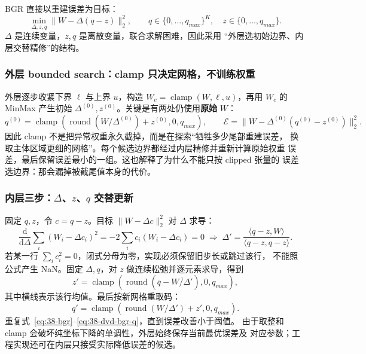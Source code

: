 BGR 直接以重建误差为目标：
\begin{equation}
  \min_{\Delta,z,q}\|W-\Delta(q-z)\|_2^2,
  \qquad q\in\{0,\ldots,q_{max}\}^K,\quad z\in\{0,\ldots,q_{max}\}.
  \label{eq:38-dvd-bgr-objective}
\end{equation}
$\Delta$ 是连续变量，$z,q$ 是离散变量，联合求解困难，因此采用
“外层选初始边界、内层交替精修”的结构。

\subsubsection{外层 bounded search：clamp 只决定网格，不训练权重}

外层逐步收紧下界 $\ell$ 与上界 $u$，构造
$W_c=\operatorname{clamp}(W,\ell,u)$，再用 $W_c$ 的 MinMax 产生初始
$\Delta^{(0)},z^{(0)}$。关键是有两处仍使用\textbf{原始} $W$：
\begin{equation}
  q^{(0)}=\operatorname{clamp}\!\left(
  \operatorname{round}(W/\Delta^{(0)})+z^{(0)},0,q_{max}\right),
  \qquad
  \mathcal E=\|W-\Delta^{(0)}(q^{(0)}-z^{(0)})\|_2^2.
  \label{eq:38-dvd-bgr-outer}
\end{equation}
因此 clamp 不是把异常权重永久截掉，而是在探索“牺牲多少尾部重建误差，
换取主体区域更细的网格”。每个候选边界都经过内层精修并重新计算原始权重
误差，最后保留误差最小的一组。这也解释了为什么不能只按 clipped 张量的
误差选边界：那会漏掉被截尾值本身的代价。

\subsubsection{内层三步：$\Delta$、$z$、$q$ 交替更新}

固定 $q,z$，令 $c=q-z$。目标 $\|W-\Delta c\|_2^2$ 对 $\Delta$ 求导：
\begin{equation}
  \frac{\mathrm d}{\mathrm d\Delta}
  \sum_i(W_i-\Delta c_i)^2
  =-2\sum_ic_i(W_i-\Delta c_i)=0
  \;\Longrightarrow\;
  \boxed{\Delta'=\frac{\langle q-z,W\rangle}
                         {\langle q-z,q-z\rangle}}.
  \label{eq:38-bgr}
\end{equation}
若某一行 $\sum_ic_i^2=0$，闭式分母为零，实现必须保留旧步长或跳过该行，
不能照公式产生 NaN。固定 $\Delta,q$，对 $z$ 做连续松弛并逐元素求导，得到
\begin{equation}
  z'=\operatorname{clamp}\!\left(
  \operatorname{round}\!\left(\overline q-
  \overline{W/\Delta'}\right),0,q_{max}\right),
  \label{eq:38-dvd-bgr-z}
\end{equation}
其中横线表示该行均值。最后按新网格重取码：
\begin{equation}
  q'=\operatorname{clamp}\!\left(
  \operatorname{round}(W/\Delta')+z',0,q_{max}\right).
  \label{eq:38-dvd-bgr-q}
\end{equation}
重复式~\ref{eq:38-bgr}--\ref{eq:38-dvd-bgr-q}，直到误差改善小于阈值。
由于取整和 clamp 会破坏纯坐标下降的单调性，外层始终保存当前最优误差及
对应参数；工程实现还可在内层只接受实际降低误差的候选。

